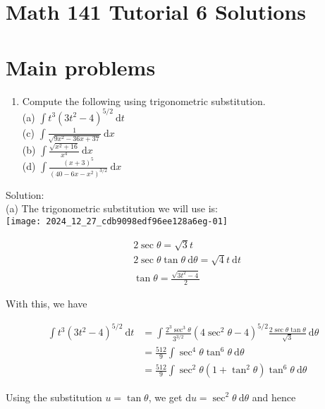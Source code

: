 \documentclass[10pt]{article}
\begin{document}
\section*{Math 141 Tutorial 6 Solutions}
\section*{Main problems}
\begin{enumerate}
  \item Compute the following using trigonometric substitution.\\
(a) $\int t^{3}\left(3 t^{2}-4\right)^{5 / 2} \mathrm{~d} t$\\
(c) $\int \frac{1}{\sqrt{9 x^{2}-36 x+37}} \mathrm{~d} x$\\
(b) $\int \frac{\sqrt{x^{2}+16}}{x^{4}} \mathrm{~d} x$\\
(d) $\int \frac{(x+3)^{5}}{\left(40-6 x-x^{2}\right)^{3 / 2}} \mathrm{~d} x$
\end{enumerate}

Solution:\\
(a) The trigonometric substitution we will use is:\\
\texttt{[image: 2024\_12\_27\_cdb9098edf96ee128a6eg-01]}

$$
\begin{aligned}
& 2 \sec \theta=\sqrt{3} t \\
& 2 \sec \theta \tan \theta \mathrm{~d} \theta=\sqrt{4} t \mathrm{~d} t \\
& \tan \theta=\frac{\sqrt{3 t^{2}-4}}{2}
\end{aligned}
$$

With this, we have

$$
\begin{aligned}
\int t^{3}\left(3 t^{2}-4\right)^{5 / 2} \mathrm{~d} t & =\int \frac{2^{3} \sec ^{3} \theta}{3^{3 / 2}}\left(4 \sec ^{2} \theta-4\right)^{5 / 2} \frac{2 \sec \theta \tan \theta}{\sqrt{3}} \mathrm{~d} \theta \\
& =\frac{512}{9} \int \sec ^{4} \theta \tan ^{6} \theta \mathrm{~d} \theta \\
& =\frac{512}{9} \int \sec ^{2} \theta\left(1+\tan ^{2} \theta\right) \tan ^{6} \theta \mathrm{~d} \theta
\end{aligned}
$$

Using the substitution $u=\tan \theta$, we get $\mathrm{d} u=\sec ^{2} \theta \mathrm{~d} \theta$ and hence
\end{document}
